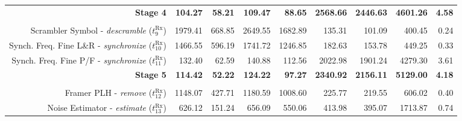 \begin{table}[htp]
{{\begin{tabular}{r | r r r r  | r r r | r}
                                                             \textbf{Stage 4} &  \textbf{104.27} &    \textbf{58.21} &   \textbf{109.47} &                          \textbf{88.65} &  \textbf{2568.66} &  \textbf{2446.63} &  \textbf{4601.26} &  \textbf{4.58} \\ %
                                                                              &                  &                   &                   &                                         &                   &                   &                   &                \\
                 Scrambler Symbol -    \emph{descramble} ($t^\text{Rx}_{9}$)  &         1979.41  &           668.85  &          2649.55  &                                 1682.89 &           135.31  &           101.09  &           400.45  &          0.24  \\
    \rowcolor{Paired-7!15}
           Synch. Freq. Fine L\&R -   \emph{synchronize} ($t^\text{Rx}_{10}$) &         1466.55  &           596.19  &          1741.72  &                                 1246.85 &           182.63  &           153.78  &           449.25  &          0.33  \\
            Synch. Freq. Fine P/F -   \emph{synchronize} ($t^\text{Rx}_{11}$) &          132.40  &            62.59  &           140.88  &                                  112.56 &          2022.98  &          1901.24  &          4279.30  &          3.61  \\ \hline
                                                             \textbf{Stage 5} &  \textbf{114.42} &    \textbf{52.22} &   \textbf{124.22} &                          \textbf{97.27} &  \textbf{2340.92} &  \textbf{2156.11} &  \textbf{5129.00} &  \textbf{4.18} \\ %
                                                                              &                  &                   &                   &                                         &                   &                   &                   &                \\
                       Framer PLH -        \emph{remove} ($t^\text{Rx}_{12}$) &         1148.07  &           427.71  &          1180.59  &                                1008.60  &           225.77  &           219.55  &           606.02  &          0.40  \\
                  Noise Estimator -      \emph{estimate} ($t^\text{Rx}_{13}$) &          626.12  &           151.24  &           656.09  &                                 550.06  &           413.98  &           395.07  &          1713.87  &          0.74  \\ \hline

\end{tabular}}}
\end{table}
